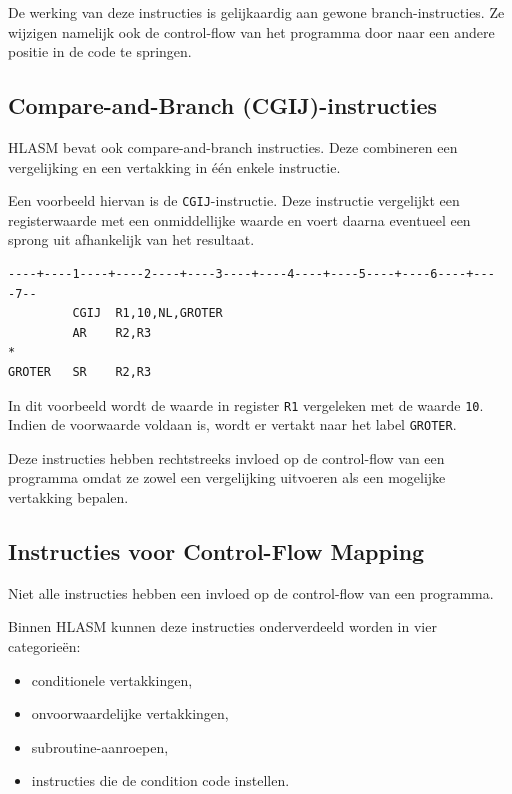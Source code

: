 De werking van deze instructies is gelijkaardig aan gewone branch-instructies. Ze wijzigen namelijk ook de control-flow van het programma door naar een andere positie in de code te springen.

\newpage

\subsection{Compare-and-Branch (CGIJ)-instructies}

HLASM bevat ook compare-and-branch instructies. Deze combineren een vergelijking en een vertakking in één enkele instructie.

Een voorbeeld hiervan is de \texttt{CGIJ}-instructie. Deze instructie vergelijkt een registerwaarde met een onmiddellijke waarde en voert daarna eventueel een sprong uit afhankelijk van het resultaat.

\begin{lstlisting}[language=HLASM, caption={Voorbeeld van een CGIJ-instructie.}]
----+----1----+----2----+----3----+----4----+----5----+----6----+----7--
         CGIJ  R1,10,NL,GROTER
         AR    R2,R3
*
GROTER   SR    R2,R3
\end{lstlisting}

In dit voorbeeld wordt de waarde in register \texttt{R1} vergeleken met de waarde \texttt{10}. Indien de voorwaarde voldaan is, wordt er vertakt naar het label \texttt{GROTER}.

Deze instructies hebben rechtstreeks invloed op de control-flow van een programma omdat ze zowel een vergelijking uitvoeren als een mogelijke vertakking bepalen.

\subsection{Instructies voor Control-Flow Mapping}

Niet alle instructies hebben een invloed op de control-flow van een programma.

Binnen HLASM kunnen deze instructies onderverdeeld worden in vier categorieën:

\begin{itemize}
    \item conditionele vertakkingen,
    \item onvoorwaardelijke vertakkingen,
    \item subroutine-aanroepen,
    \item instructies die de condition code instellen.
\end{itemize}

